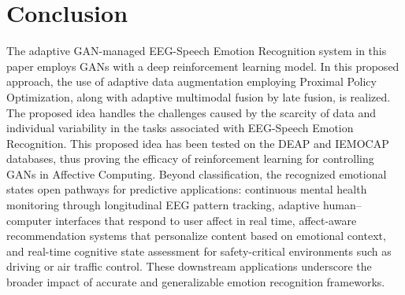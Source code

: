 \documentclass[conference]{IEEEtran}
\begin{document}
\section{Conclusion}
The adaptive GAN-managed EEG-Speech Emotion Recognition system in this paper employs GANs with a deep reinforcement learning model. In this proposed approach, the use of adaptive data augmentation employing Proximal Policy Optimization, along with adaptive multimodal fusion by late fusion, is realized. The proposed idea handles the challenges caused by the scarcity of data and individual variability in the tasks associated with EEG-Speech Emotion Recognition. This proposed idea has been tested on the DEAP and IEMOCAP databases, thus proving the efficacy of reinforcement learning for controlling GANs in Affective Computing. Beyond classification, the recognized emotional states open pathways for predictive applications: continuous mental health monitoring through longitudinal EEG pattern tracking, adaptive human--computer interfaces that respond to user affect in real time, affect-aware recommendation systems that personalize content based on emotional context, and real-time cognitive state assessment for safety-critical environments such as driving or air traffic control. These downstream applications underscore the broader impact of accurate and generalizable emotion recognition frameworks.
\end{document}
